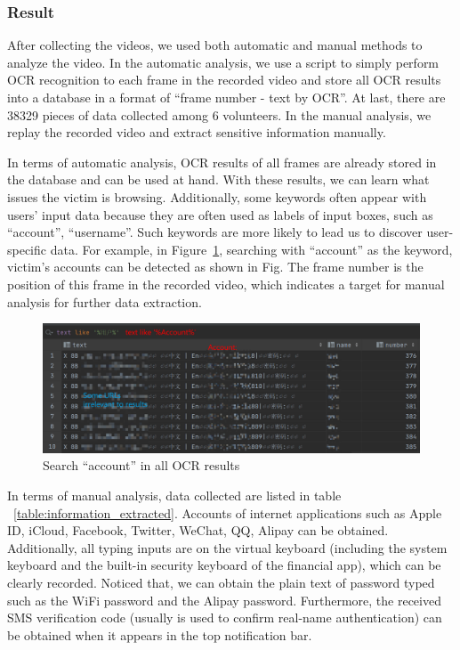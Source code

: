 \subsubsection{Result}

After collecting the videos, we used both automatic and manual methods to analyze the video. In the automatic analysis, we use a script to simply perform OCR recognition to each frame in the recorded video and store all OCR results into a database in a format of ``frame number - text by OCR''. At last, there are 38329 pieces of data collected among 6 volunteers. In the manual analysis, we replay the recorded video and extract sensitive information manually.

In terms of automatic analysis, OCR results of all frames are already stored in the database and can be used at hand. With these results, we can learn what issues the victim is browsing. Additionally, some keywords often appear with users' input data because they are often used as labels of input boxes, such as ``account'', ``username''. Such keywords are more likely to lead us to discover user-specific data. For example, in Figure~\ref{fig:ocr_keyword_example}, searching with ``account'' as the keyword, victim's accounts can be detected as shown in Fig. The frame number is the position of this frame in the recorded video, which indicates a target for manual analysis for further data extraction.

\begin{figure}[hbtp]
	\centering
	\includegraphics[width=\linewidth]{./Figs/ocr_keyword_example.png}
	\caption{Search ``account'' in all OCR results}
	\label{fig:ocr_keyword_example}
\end{figure}

In terms of manual analysis, data collected are listed in table ~\ref{table:information_extracted}. Accounts of internet applications such as Apple ID, iCloud, Facebook, Twitter, WeChat, QQ, Alipay can be obtained. Additionally, all typing inputs are on the virtual keyboard (including the system keyboard and the built-in security keyboard of the financial app), which can be clearly recorded. Noticed that, we can obtain the plain text of password typed such as the WiFi password and the Alipay password. Furthermore, the received SMS verification code (usually is used to confirm real-name authentication) can be obtained when it appears in the top notification bar. 


